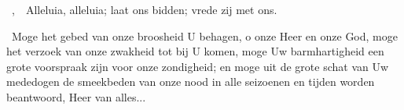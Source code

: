 \documentclass[12pt,twoside,a5paper]{article}
\begin{document}
\begin{halfparskip}
  ~\sep\ \dd~Alleluia, alleluia; laat ons bidden; vrede zij met ons.

  \cc~Moge het gebed van onze broosheid U behagen, o onze Heer en onze God, moge het verzoek van onze zwakheid tot bij U komen, moge Uw barmhartigheid een grote voorspraak zijn voor onze zondigheid; en moge uit de grote schat van Uw mededogen de smeekbeden van onze nood in alle seizoenen en tijden worden beantwoord, Heer van alles...
\end{halfparskip}



\begin{halfparskip}
\end{halfparskip}
\end{document}
